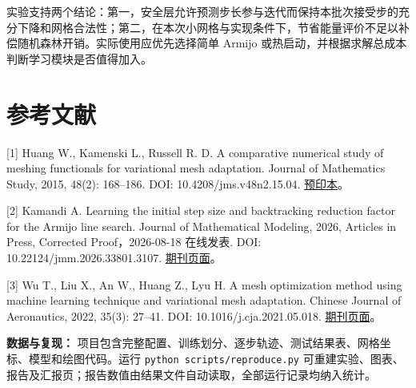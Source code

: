 \documentclass[UTF8,a4paper,zihao=5,fontset=fandol]{ctexart}
\begin{document}
实验支持两个结论：第一，安全层允许预测步长参与迭代而保持本批次接受步的充分下降和网格合法性；第二，在本次小网格与实现条件下，节省能量评价不足以补偿随机森林开销。实际使用应优先选择简单 Armijo 或热启动，并根据求解总成本判断学习模块是否值得加入。


\section*{参考文献}

[1] Huang W., Kamenski L., Russell R. D. A comparative numerical study of meshing functionals for variational mesh adaptation. Journal of Mathematics Study, 2015, 48(2): 168–186. DOI: 10.4208/jms.v48n2.15.04. \href{https://arxiv.org/abs/1503.04709}{预印本}。


[2] Kamandi A. Learning the initial step size and backtracking reduction factor for the Armijo line search. Journal of Mathematical Modeling, 2026, Articles in Press, Corrected Proof，2026-08-18 在线发表. DOI: 10.22124/jmm.2026.33801.3107. \href{https://jmm.guilan.ac.ir/article\_9844.html}{期刊页面}。


[3] Wu T., Liu X., An W., Huang Z., Lyu H. A mesh optimization method using machine learning technique and variational mesh adaptation. Chinese Journal of Aeronautics, 2022, 35(3): 27–41. DOI: 10.1016/j.cja.2021.05.018. \href{https://www.sciopen.com/article/10.1016/j.cja.2021.05.018}{期刊页面}。


\textbf{数据与复现：} 项目包含完整配置、训练划分、逐步轨迹、测试结果表、网格坐标、模型和绘图代码。运行 \texttt{python scripts/reproduce.py} 可重建实验、图表、报告及汇报页；报告数值由结果文件自动读取，全部运行记录均纳入统计。
\end{document}
